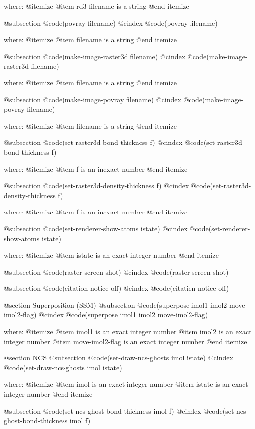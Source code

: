 where: 
 @itemize 
     @item rd3-filename is a string
 @end itemize


@subsection @code{(povray filename)}
@cindex @code{(povray filename)}
 
where: 
 @itemize 
     @item filename is a string
 @end itemize


@subsection @code{(make-image-raster3d filename)}
@cindex @code{(make-image-raster3d filename)}
 
where: 
 @itemize 
     @item filename is a string
 @end itemize


@subsection @code{(make-image-povray filename)}
@cindex @code{(make-image-povray filename)}
 
where: 
 @itemize 
     @item filename is a string
 @end itemize


@subsection @code{(set-raster3d-bond-thickness f)}
@cindex @code{(set-raster3d-bond-thickness f)}
 
where: 
 @itemize 
     @item f is an inexact number
 @end itemize


@subsection @code{(set-raster3d-density-thickness f)}
@cindex @code{(set-raster3d-density-thickness f)}
 
where: 
 @itemize 
     @item f is an inexact number
 @end itemize


@subsection @code{(set-renderer-show-atoms istate)}
@cindex @code{(set-renderer-show-atoms istate)}
 
where: 
 @itemize 
     @item istate is an exact integer number
 @end itemize


@subsection @code{(raster-screen-shot)}
@cindex @code{(raster-screen-shot)}
 
@subsection @code{(citation-notice-off)}
@cindex @code{(citation-notice-off)}
 

@section Superposition (SSM) 
@subsection @code{(superpose imol1 imol2 move-imol2-flag)}
@cindex @code{(superpose imol1 imol2 move-imol2-flag)}
 
where: 
 @itemize 
     @item imol1 is an exact integer number
     @item imol2 is an exact integer number
     @item move-imol2-flag is an exact integer number
 @end itemize



@section NCS 
@subsection @code{(set-draw-ncs-ghosts imol istate)}
@cindex @code{(set-draw-ncs-ghosts imol istate)}
 
where: 
 @itemize 
     @item imol is an exact integer number
     @item istate is an exact integer number
 @end itemize


@subsection @code{(set-ncs-ghost-bond-thickness imol f)}
@cindex @code{(set-ncs-ghost-bond-thickness imol f)}
 
